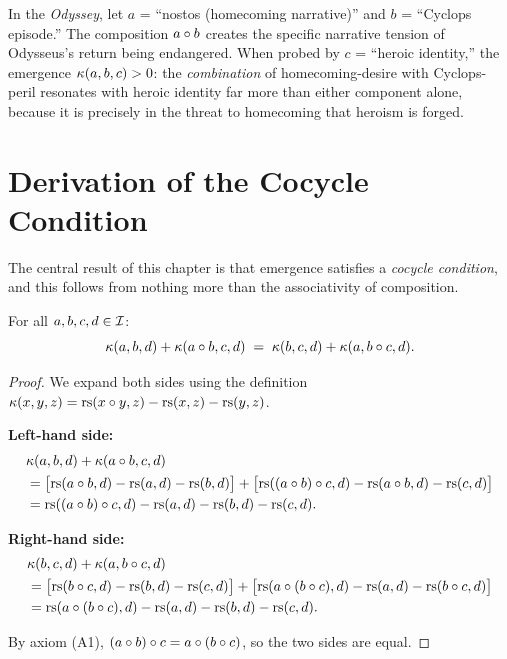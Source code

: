 \begin{example}
In the \emph{Odyssey}, let $a$ = ``nostos (homecoming narrative)'' and
$b$ = ``Cyclops episode.'' The composition $a \circ b$ creates the
specific narrative tension of Odysseus's return being endangered. When
probed by $c$ = ``heroic identity,'' the emergence $\kappa(a,b,c) > 0$:
the \emph{combination} of homecoming-desire with Cyclops-peril resonates
with heroic identity far more than either component alone, because it is
precisely in the threat to homecoming that heroism is forged.
\end{example}

\section{Derivation of the Cocycle Condition}

The central result of this chapter is that emergence satisfies a
\emph{cocycle condition}, and this follows from nothing more than the
associativity of composition.

\begin{theorem}\label{thm:cocycle}
For all $a, b, c, d \in \mathcal{I}$:
\[
    \kappa(a, b, d) + \kappa(a \circ b, c, d) \;=\;
    \kappa(b, c, d) + \kappa(a, b \circ c, d).
\]
\end{theorem}
\begin{proof}
We expand both sides using the definition $\kappa(x,y,z) =
\mathrm{rs}(x \circ y, z) - \mathrm{rs}(x,z) - \mathrm{rs}(y,z)$.

\textbf{Left-hand side:}
\begin{align*}
    &\kappa(a, b, d) + \kappa(a \circ b, c, d) \\
    &= \bigl[\mathrm{rs}(a \circ b, d) - \mathrm{rs}(a, d) - \mathrm{rs}(b, d)\bigr]
     + \bigl[\mathrm{rs}((a \circ b) \circ c, d) - \mathrm{rs}(a \circ b, d)
       - \mathrm{rs}(c, d)\bigr] \\
    &= \mathrm{rs}((a \circ b) \circ c, d) - \mathrm{rs}(a, d) - \mathrm{rs}(b, d)
       - \mathrm{rs}(c, d).
\end{align*}

\textbf{Right-hand side:}
\begin{align*}
    &\kappa(b, c, d) + \kappa(a, b \circ c, d) \\
    &= \bigl[\mathrm{rs}(b \circ c, d) - \mathrm{rs}(b, d) - \mathrm{rs}(c, d)\bigr]
     + \bigl[\mathrm{rs}(a \circ (b \circ c), d) - \mathrm{rs}(a, d)
       - \mathrm{rs}(b \circ c, d)\bigr] \\
    &= \mathrm{rs}(a \circ (b \circ c), d) - \mathrm{rs}(a, d) - \mathrm{rs}(b, d)
       - \mathrm{rs}(c, d).
\end{align*}

By axiom (A1), $(a \circ b) \circ c = a \circ (b \circ c)$,
so the two sides are equal.
\end{proof}

